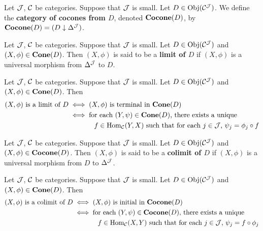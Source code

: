 \documentclass{book}
\begin{document}
	\begin{defn}
		Let $\mathcal{J}$, $\mathcal{C}$ be categories. Suppose that $\mathcal{J}$ is small. Let $D \in \operatorname{Obj}(\mathcal{C}^{\mathcal{J}})$. We define the \textbf{category of cocones from $D$}, denoted $\operatorname*{\text{\textbf{Cocone}}}(D)$, by $\operatorname*{\text{\textbf{Cocone}}}(D) = (D \downarrow \Delta^{\mathcal{J}})$.
	\end{defn}

	\begin{defn}
		Let $\mathcal{J}$, $\mathcal{C}$ be categories. Suppose that $\mathcal{J}$ is small. Let $D \in \operatorname{Obj}(\mathcal{C}^{\mathcal{J}})$ and $(X, \phi) \in \operatorname*{\text{\textbf{Cone}}}(D)$. Then $(X, \phi)$ is said to be a \textbf{limit of $D$} if $(X, \phi)$ is a universal morphism from $\Delta^{\mathcal{J}}$ to $D$.  
	\end{defn}



	\begin{note}
		Let $\mathcal{J}$, $\mathcal{C}$ be categories. Suppose that $\mathcal{J}$ is small. Let $D \in \operatorname{Obj}(\mathcal{C}^{\mathcal{J}})$ and $(X, \phi) \in \operatorname*{\text{\textbf{Cone}}}(D)$. Then 
		\begin{align*}
			\text{$(X, \phi)$  is a limit of $D$} 
			& \iff \text{$(X, \phi)$ is terminal in $\operatorname*{\text{\textbf{Cone}}}(D)$} \\
			& \iff \text{for each $(Y, \psi) \in \operatorname*{\text{\textbf{Cone}}}(D)$, there exists a unique} \\
			& \hspace{1.3cm }\text{$f \in \operatorname{Hom}_{\mathcal{C}}(Y, X)$ such that for each $j \in \mathcal{J}$, $\psi_j = \phi_j \circ f$}
		\end{align*} 
	\end{note} 


	\begin{defn}
		Let $\mathcal{J}$, $\mathcal{C}$ be categories. Suppose that $\mathcal{J}$ is small. Let $D \in \operatorname{Obj}(\mathcal{C}^{\mathcal{J}})$ and $(X, \phi) \in \operatorname*{\text{\textbf{Cocone}}}(D)$. Then $(X, \phi)$ is said to be a \textbf{colimit of $D$} if $(X, \phi)$ is a universal morphism from $D$ to $\Delta^{\mathcal{J}}$.  
	\end{defn}

	\begin{note}
		Let $\mathcal{J}$, $\mathcal{C}$ be categories. Suppose that $\mathcal{J}$ is small. Let $D \in \operatorname{Obj}(\mathcal{C}^{\mathcal{J}})$ and $(X, \phi) \in \operatorname*{\text{\textbf{Cone}}}(D)$. Then 
		\begin{align*}
			\text{$(X, \phi)$  is a colimit of $D$} 
			& \iff \text{$(X, \phi)$ is initial in $\operatorname*{\text{\textbf{Cocone}}}(D)$} \\
			& \iff \text{for each $(Y, \psi) \in \operatorname*{\text{\textbf{Cocone}}}(D)$, there exists a unique} \\
			& \hspace{1.3cm }\text{$f \in \operatorname{Hom}_{\mathcal{C}}(X, Y)$ such that for each $j \in \mathcal{J}$, $\psi_j = f \circ \phi_j $}
		\end{align*} 
	\end{note} 
\end{document}
